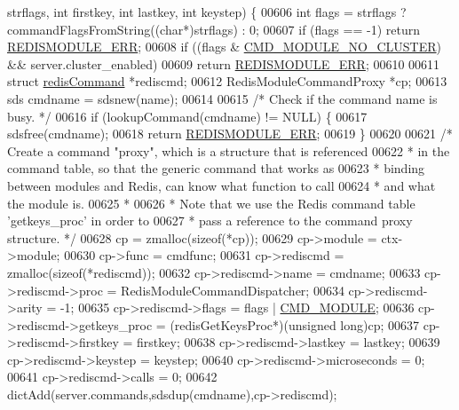 \begin{DoxyCode}
{      strflags, \textcolor{keywordtype}{int} firstkey, \textcolor{keywordtype}{int} lastkey, \textcolor{keywordtype}{int} keystep) \{
00606     \textcolor{keywordtype}{int} flags = strflags ? commandFlagsFromString((\textcolor{keywordtype}{char}*)strflags) : 0;
00607     \textcolor{keywordflow}{if} (flags == -1) \textcolor{keywordflow}{return} \hyperlink{redismodule_8h_a3df6f5bd5247289e66f44437a7cddd49}{REDISMODULE\_ERR};
00608     \textcolor{keywordflow}{if} ((flags & \hyperlink{server_8h_abf1e33c6cd6f59383cb155fa0e164fcd}{CMD\_MODULE\_NO\_CLUSTER}) && server.cluster\_enabled)
00609         \textcolor{keywordflow}{return} \hyperlink{redismodule_8h_a3df6f5bd5247289e66f44437a7cddd49}{REDISMODULE\_ERR};
00610 
00611     \textcolor{keyword}{struct} \hyperlink{structredisCommand}{redisCommand} *rediscmd;
00612     RedisModuleCommandProxy *cp;
00613     sds cmdname = sdsnew(name);
00614 
00615     \textcolor{comment}{/* Check if the command name is busy. */}
00616     \textcolor{keywordflow}{if} (lookupCommand(cmdname) != NULL) \{
00617         sdsfree(cmdname);
00618         \textcolor{keywordflow}{return} \hyperlink{redismodule_8h_a3df6f5bd5247289e66f44437a7cddd49}{REDISMODULE\_ERR};
00619     \}
00620 
00621     \textcolor{comment}{/* Create a command "proxy", which is a structure that is referenced}
00622 \textcolor{comment}{     * in the command table, so that the generic command that works as}
00623 \textcolor{comment}{     * binding between modules and Redis, can know what function to call}
00624 \textcolor{comment}{     * and what the module is.}
00625 \textcolor{comment}{     *}
00626 \textcolor{comment}{     * Note that we use the Redis command table 'getkeys\_proc' in order to}
00627 \textcolor{comment}{     * pass a reference to the command proxy structure. */}
00628     cp = zmalloc(\textcolor{keyword}{sizeof}(*cp));
00629     cp->module = ctx->module;
00630     cp->func = cmdfunc;
00631     cp->rediscmd = zmalloc(\textcolor{keyword}{sizeof}(*rediscmd));
00632     cp->rediscmd->name = cmdname;
00633     cp->rediscmd->proc = RedisModuleCommandDispatcher;
00634     cp->rediscmd->arity = -1;
00635     cp->rediscmd->flags = flags | \hyperlink{server_8h_accabd32f20281543986166c219124f9e}{CMD\_MODULE};
00636     cp->rediscmd->getkeys\_proc = (redisGetKeysProc*)(\textcolor{keywordtype}{unsigned} \textcolor{keywordtype}{long})cp;
00637     cp->rediscmd->firstkey = firstkey;
00638     cp->rediscmd->lastkey = lastkey;
00639     cp->rediscmd->keystep = keystep;
00640     cp->rediscmd->microseconds = 0;
00641     cp->rediscmd->calls = 0;
00642     dictAdd(server.commands,sdsdup(cmdname),cp->rediscmd);
}
\end{DoxyCode}
